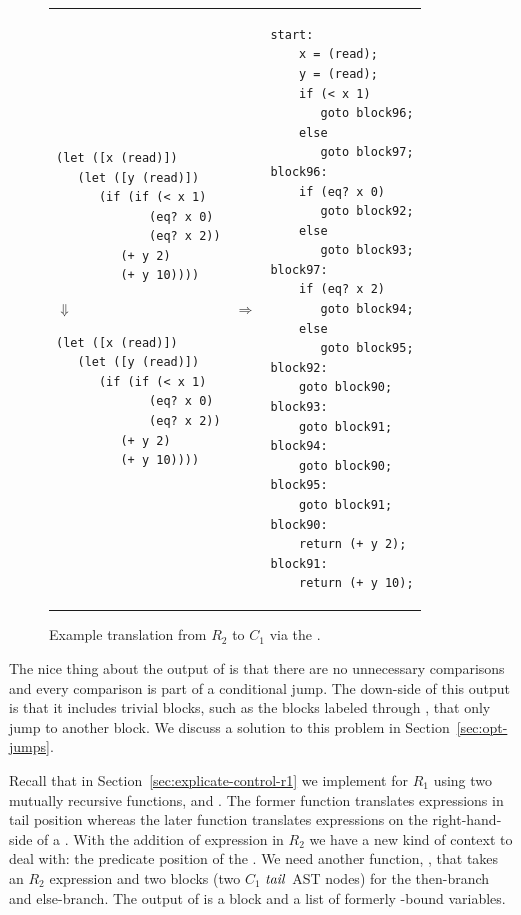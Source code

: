 \documentclass[11pt]{book}
\begin{document}
\begin{figure}[tbp]
\begin{tabular}{lll}
\begin{minipage}{0.4\textwidth}
\begin{lstlisting}
(let ([x (read)])
   (let ([y (read)])
      (if (if (< x 1)
             (eq? x 0)
             (eq? x 2))
         (+ y 2)
         (+ y 10))))
\end{lstlisting}
\hspace{40pt}$\Downarrow$
\begin{lstlisting}
(let ([x (read)])
   (let ([y (read)])
      (if (if (< x 1)
             (eq? x 0)
             (eq? x 2))
         (+ y 2)
         (+ y 10))))
\end{lstlisting}
\end{minipage}
&
$\Rightarrow$
&
\begin{minipage}{0.55\textwidth}
\begin{lstlisting}
start:
    x = (read);
    y = (read);
    if (< x 1)
       goto block96;
    else
       goto block97;
block96:
    if (eq? x 0)
       goto block92;
    else
       goto block93;
block97:
    if (eq? x 2)
       goto block94;
    else
       goto block95;
block92:
    goto block90;
block93:
    goto block91;
block94:
    goto block90;
block95:
    goto block91;
block90:
    return (+ y 2);
block91:
    return (+ y 10);
\end{lstlisting}
\end{minipage}
\end{tabular} 

\caption{Example translation from $R_2$ to $C_1$
  via the .}
\label{fig:explicate-control-s1-38}
\end{figure}

The nice thing about the output of  is that
there are no unnecessary comparisons and every comparison is part of a
conditional jump. The down-side of this output is that it includes
trivial blocks, such as the blocks labeled  through
, that only jump to another block. We discuss a solution
to this problem in Section~\ref{sec:opt-jumps}.

Recall that in Section~\ref{sec:explicate-control-r1} we implement
 for $R_1$ using two mutually recursive
functions,  and .  The
former function translates expressions in tail position whereas the
later function translates expressions on the right-hand-side of a
. With the addition of  expression in $R_2$ we have a
new kind of context to deal with: the predicate position of the
. We need another function, , that takes
an $R_2$ expression and two blocks (two $C_1$ $\mathit{tail}$ AST nodes) for
the then-branch and else-branch. The output of 
is a block and a list of formerly -bound variables.
\end{document}
